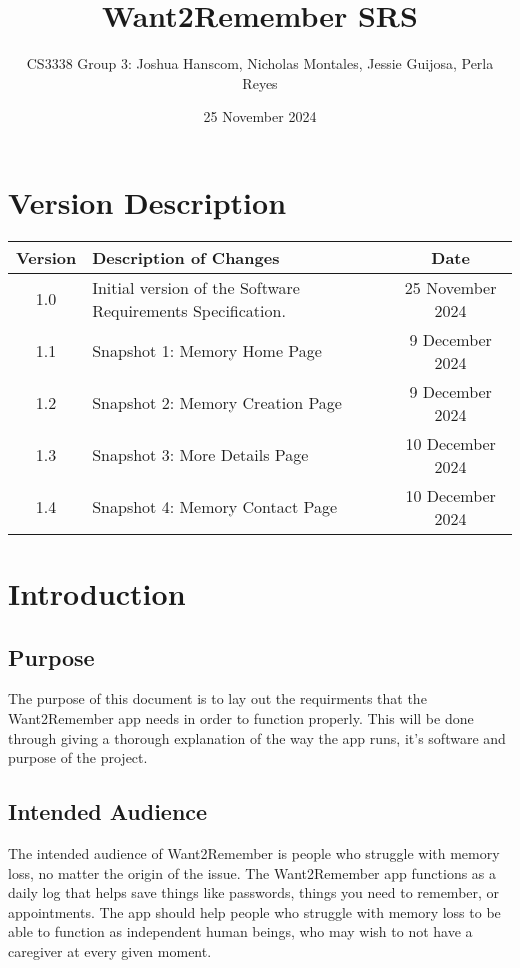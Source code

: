 \documentclass{article}
\title{Want2Remember SRS}
\author{CS3338 Group 3: Joshua Hanscom, Nicholas Montales, Jessie Guijosa, Perla Reyes}
\date{25 November 2024}
\begin{document}
\maketitle
\newpage
\tableofcontents
\newpage
\section*{Version Description}
\begin{tabular}{|c|p{10cm}|c|}
\hline
\textbf{Version} & \textbf{Description of Changes} & \textbf{Date} \\ \hline
1.0 & Initial version of the Software Requirements Specification. & 25 November 2024 \\ \hline
1.1 & Snapshot 1: Memory Home Page & 9 December 2024 \\ \hline
1.2 & Snapshot 2: Memory Creation Page & 9 December 2024 \\ \hline
1.3 & Snapshot 3: More Details Page & 10 December 2024 \\ \hline
1.4 & Snapshot 4: Memory Contact Page & 10 December 2024 \\ \hline
\end{tabular}
\newpage

\section{Introduction}
\subsection{Purpose}
The purpose of this document is to lay out the requirments that the Want2Remember app needs in order to function properly. This will be done through giving a thorough explanation of the way the app runs, it's software and purpose of the project.

\subsection{Intended Audience}
The intended audience of Want2Remember is people who struggle with memory loss, no matter the origin of the issue. The Want2Remember app functions as a daily log that helps save things like passwords, things you need to remember, or appointments. The app should help people who struggle with memory loss to be able to function as independent human beings, who may wish to not have a caregiver at every given moment. 
\end{document}

